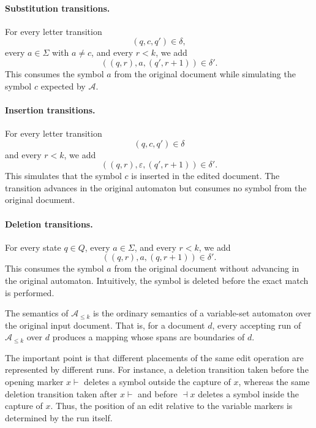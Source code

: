 \paragraph{Substitution transitions.}
For every letter transition
\[
(q,c,q')\in\delta,
\]
every \(a\in\Sigma\) with \(a\neq c\), and every \(r<k\), we add
\[
((q,r),a,(q',r+1))\in\delta'.
\]
This consumes the symbol \(a\) from the original document while simulating the
symbol \(c\) expected by \(\mathcal{A}\).

\paragraph{Insertion transitions.}
For every letter transition
\[
(q,c,q')\in\delta
\]
and every \(r<k\), we add
\[
((q,r),\varepsilon,(q',r+1))\in\delta'.
\]
This simulates that the symbol \(c\) is inserted in the edited document. The
transition advances in the original automaton but consumes no symbol from the
original document.

\paragraph{Deletion transitions.}
For every state \(q\in Q\), every \(a\in\Sigma\), and every \(r<k\), we add
\[
((q,r),a,(q,r+1))\in\delta'.
\]
This consumes the symbol \(a\) from the original document without advancing in
the original automaton. Intuitively, the symbol is deleted before the exact
match is performed.

The semantics of \(\mathcal{A}_{\leq k}\) is the ordinary semantics of a
variable-set automaton over the original input document. That is, for a document
\(d\), every accepting run of \(\mathcal{A}_{\leq k}\) over \(d\) produces a
mapping whose spans are boundaries of \(d\).

The important point is that different placements of the same edit operation are
represented by different runs. For instance, a deletion transition taken before
the opening marker \(x\vdash\) deletes a symbol outside the capture of \(x\),
whereas the same deletion transition taken after \(x\vdash\) and before
\(\dashv x\) deletes a symbol inside the capture of \(x\). Thus, the position of
an edit relative to the variable markers is determined by the run itself.